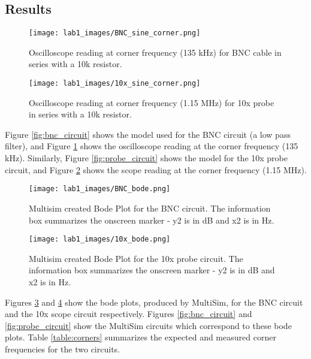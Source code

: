 \documentclass[12pt,letterpaper]{report}
\newlength \figwidth
\begin{document}
\subsection*{Results}

\begin{figure}
	\centering
	\texttt{[image: lab1\_images/BNC\_sine\_corner.png]} 
	\caption{Oscilloscope reading at corner frequency (135 kHz) for BNC cable in series with a 10k resistor. }
	\label{fig:bnc_corner}
\end{figure}

\begin{figure}
	\centering
	\texttt{[image: lab1\_images/10x\_sine\_corner.png]} 
	\caption{Oscilloscope reading at corner frequency (1.15 MHz) for 10x probe in series with a 10k resistor. }
	\label{fig:probe_corner}
\end{figure}

Figure \ref{fig:bnc_circuit} shows the model used for the BNC circuit (a low pass filter), and Figure \ref{fig:bnc_corner} shows the oscilloscope reading at the corner frequency (135 kHz). Similarly, Figure \ref{fig:probe_circuit} shows the model for the 10x probe circuit, and Figure \ref{fig:probe_corner} shows the scope reading at the corner frequency (1.15 MHz).

\begin{figure}
	\centering
	\texttt{[image: lab1\_images/BNC\_bode.png]} 
	\caption{Multisim created Bode Plot for the BNC circuit. The information box summarizes the onscreen marker - y2 is in dB and x2 is in Hz. }
	\label{fig:bnc_bode}
\end{figure}

\begin{figure}
	\centering
	\texttt{[image: lab1\_images/10x\_bode.png]} 
	\caption{Multisim created Bode Plot for the 10x probe circuit. The information box summarizes the onscreen marker - y2 is in dB and x2 is in Hz. }
	\label{fig:probe_bode}
\end{figure}

Figures \ref{fig:bnc_bode} and \ref{fig:probe_bode} show the bode plots, produced by MultiSim, for the BNC circuit and the 10x scope circuit respectively. Figures \ref{fig:bnc_circuit} and \ref{fig:probe_circuit} show the MultiSim circuits which correspond to these bode plots. Table \ref{table:corners} summarizes the expected and measured corner frequencies for the two circuits.
\end{document}
